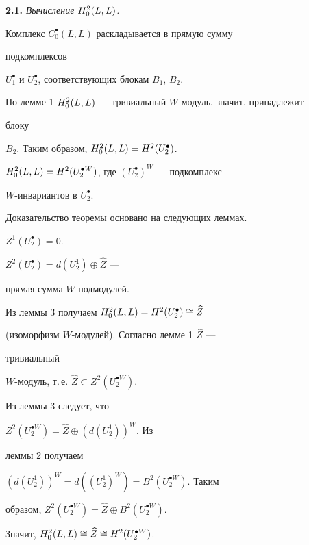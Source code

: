  


{\bf 2.1.} {\it Вычисление $H^2_0(L,L)$.} 


Комплекс $C^{\bullet}_0(L,L)$ раскладывается в прямую сумму 


подкомплексов 


$U^{\bullet}_1$ и $U^{\bullet}_2$, соответствующих блокам $B_1$, $B_2$. 


По лемме 1\; $H^2_0(L,L)$ --- тривиальный $W$-модуль, значит, принадлежит 


блоку 


$B_2$. Таким образом, $H^2_0(L,L)=H^2(U^{\bullet}_2)$. 


 


\begin{thmnonum} 


$H^2_0(L,L)=H^2(U^{\bullet W}_2)$, где $(U^{\bullet}_2)^W$ --- подкомплекс 


$W$-инвариантов в $U^{\bullet}_2$. 


\end{thmnonum} 


 


Доказательство теоремы основано на следующих леммах. 


 


\begin {lem} 


$Z^1(U^{\bullet}_2)=0$. 


\end {lem} 


 


\begin {lem} 


$Z^2(U^{\bullet}_2)=d(U^1_2)\oplus \widehat Z$ --- 


прямая сумма $W$-подмодулей. 


\end{lem} 


 


\begin{pf} 


Из леммы 3 получаем $H^2_0(L,L)=H^2(U^{\bullet}_2)\cong\widehat Z$ 


(изоморфизм $W$-модулей). Согласно лемме 1\; $\widehat Z$ --- 


тривиальный 


$W$-модуль, т.\,е. $\widehat Z\subset Z^2(U^{\bullet W}_2)$. 


Из леммы 3 следует, что 


$Z^2(U^{\bullet W}_2)=\widehat Z\oplus (d(U^1_{2}))^W$. Из 


леммы 2 получаем 


$(d(U^1_2))^W=d((U^1_2)^W)=B^2(U^{\bullet W}_2)$. Таким 


образом, $Z^2(U^{\bullet W}_2)=\widehat Z\oplus B^2(U^{\bullet W}_2)$. 


Значит, $H^2_0(L,L)\cong\widehat Z\cong H^2(U^{\bullet W}_2)$. 


\end{pf} 


